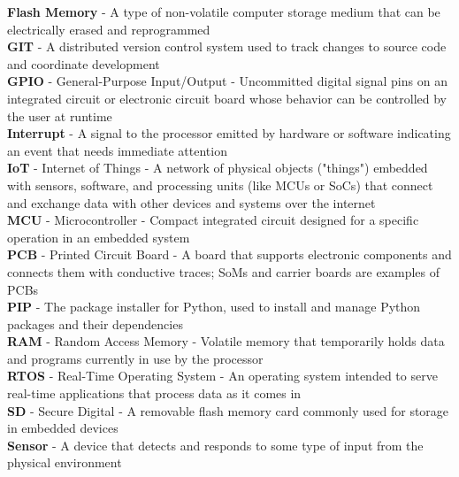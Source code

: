\begin{singlespace}
\textbf{Flash Memory} - A type of non-volatile computer storage medium that
can be electrically erased and reprogrammed  \\

\textbf{GIT} - A distributed version control system used to track changes
to source code and coordinate development  \\

\textbf{GPIO} - General-Purpose Input/Output - Uncommitted digital signal
pins on an integrated circuit or electronic circuit board whose behavior
can be controlled by the user at runtime  \\

\textbf{Interrupt} - A signal to the processor emitted by hardware or software
indicating an event that needs immediate attention  \\

\textbf{IoT} - Internet of Things - A network of physical objects ("things")
embedded with sensors, software, and processing units (like MCUs or SoCs)
that connect and exchange data with other devices and systems over the
internet  \\

\textbf{MCU} - Microcontroller - Compact integrated circuit designed for
a specific operation in an embedded system  \\

\textbf{PCB} - Printed Circuit Board - A board that supports electronic
components and connects them with conductive traces; SoMs and carrier
boards are examples of PCBs  \\

\textbf{PIP} - The package installer for Python, used to install and manage
Python packages and their dependencies  \\

\textbf{RAM} - Random Access Memory - Volatile memory that temporarily
holds data and programs currently in use by the processor  \\

\textbf{RTOS} - Real-Time Operating System - An operating system intended to
serve real-time applications that process data as it comes in  \\

\textbf{SD} - Secure Digital - A removable flash memory card commonly
used for storage in embedded devices  \\

\textbf{Sensor} - A device that detects and responds to some type of input
from the physical environment  \\


\end{singlespace}
